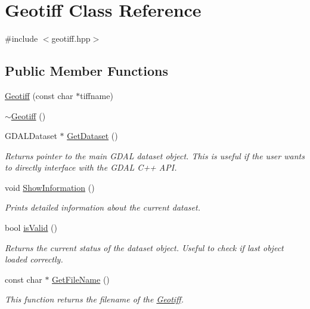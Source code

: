 \hypertarget{class_geotiff}{}\section{Geotiff Class Reference}
\label{class_geotiff}


{\ttfamily \#include $<$geotiff.\+hpp$>$}

\subsection*{Public Member Functions}
\begin{DoxyCompactItemize}
\item 
\hyperlink{class_geotiff_a6afb0b8b363cd25ba034abdeffe349b0}{Geotiff} (const char $\ast$tiffname)
\item 
\hyperlink{class_geotiff_a6cbb41e1cc6005e33490d66f9bc6467a}{$\sim$\+Geotiff} ()
\item 
G\+D\+A\+L\+Dataset $\ast$ \hyperlink{class_geotiff_a7494d80a2bf47222aabeb18cb8ff105b}{Get\+Dataset} ()
\begin{DoxyCompactList}\small\item\em Returns pointer to the main G\+D\+AL dataset object. This is useful if the user wants to directly interface with the G\+D\+AL C++ A\+PI. \end{DoxyCompactList}\item 
void \hyperlink{class_geotiff_a14b4f3434d6d06f5b50b51ba8ebdf0d3}{Show\+Information} ()
\begin{DoxyCompactList}\small\item\em Prints detailed information about the current dataset. \end{DoxyCompactList}\item 
bool \hyperlink{class_geotiff_a89fbf267a0d1afe1c1773201d359f3fa}{is\+Valid} ()
\begin{DoxyCompactList}\small\item\em Returns the current status of the dataset object. Useful to check if last object loaded correctly. \end{DoxyCompactList}\item 
const char $\ast$ \hyperlink{class_geotiff_ab5ba8ecf1483c3808285c7394c26d556}{Get\+File\+Name} ()
\begin{DoxyCompactList}\small\item\em This function returns the filename of the \hyperlink{class_geotiff}{Geotiff}. \end{DoxyCompactList}\item 

\end{DoxyCompactItemize}

